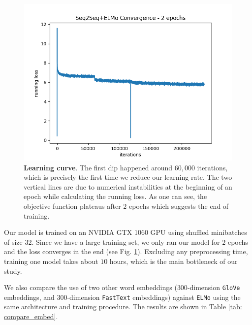 \begin{figure}
\centering
\includegraphics[width=\linewidth]{figures/convergence.png}
\vspace{-8mm}
\caption{\textbf{Learning curve}. The first dip happened around $60,000$ iterations, which is precisely the first time we reduce our learning rate. The two vertical lines are due to numerical instabilities at the beginning of an epoch while calculating the running loss. As one can see, the objective function plateaus after $2$ epochs which suggests the end of training.}
\label{fig: convergence}
\end{figure}

Our model is trained on an NVIDIA GTX 1060 GPU using shuffled minibatches of size $32$. Since we have a large training set, we only ran our model for $2$ epochs and the loss converges in the end (see Fig. \ref{fig: convergence}). Excluding any preprocessing time, training one model takes about $10$ hours, which is the main bottleneck of our study.

We also compare the use of two other word embeddings ($300$-dimension \texttt{GloVe} embeddings, and $300$-dimension \texttt{FastText} embeddings) against \texttt{ELMo} using the same architecture and training procedure. The results are shown in Table \ref{tab: compare_embed}.




